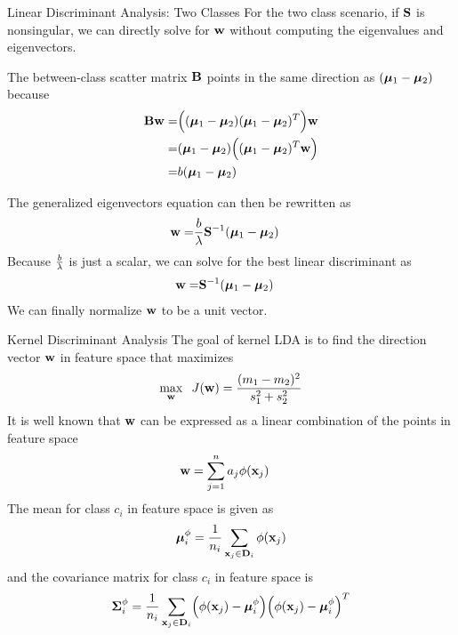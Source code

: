 \begin{frame}{Linear Discriminant Analysis: Two Classes}
For the two class scenario, if $\mathbf{S}$ is nonsingular, we can
directly solve for $\mathbf{w}$ without computing the eigenvalues and
eigenvectors. 

\medskip
The between-class scatter matrix $\mathbf{B}$
points in the same direction as $({\bm \mu}_1-{\bm \mu}_2)$ because
\begin{align*}
  \mathbf{B}\mathbf{w} = & \Bigl( ({\bm \mu}_1 - {\bm \mu}_2) ({\bm \mu}_1 - {\bm \mu}_2)^T\Bigr) \mathbf{w}\notag\\
  = & ({\bm \mu}_1 - {\bm \mu}_2) \Bigl(({\bm \mu}_1 - {\bm \mu}_2)^T \mathbf{w}\Bigr)\notag\\
  = & b ({\bm \mu}_1 - {\bm \mu}_2)
\end{align*}

\medskip
The generalized eigenvectors equation can then be 
rewritten as 
\begin{align*}
  \mathbf{w} = & \frac{b}{\lambda} \mathbf{S}^{-1} ({\bm \mu}_1 - {\bm \mu}_2)
\end{align*}
Because ${b \over \lambda}$ is just a scalar, we can solve for the
best linear discriminant as
\begin{align*}
  \mathbf{w} = & \mathbf{S}^{-1} ({\bm \mu}_1 - {\bm \mu}_2)
\end{align*}
We can finally normalize $\mathbf{w}$ to be a unit vector.
\end{frame}



\begin{frame}{Kernel Discriminant Analysis} 
The goal of kernel LDA is to f\/{i}nd the direction vector $\mathbf{w}$ in
feature space that maximizes
\begin{align*}
        \max_{\mathbf{w}} \;\; J(\mathbf{w}) = \frac{(m_1 - m_2)^2}{s_1^2 + s_2^2}
\end{align*}
It is well known that 
$\mathbf{w}$ can be expressed as a linear combination of the
points in feature space
\begin{align*}
  \mathbf{w} 
  & = \sum_{j=1}^n a_{j} \phi(\mathbf{x}_{j})
\end{align*}
The mean for class $c_i$ in feature space is given as
\begin{align*}
{\bm \mu}^\phi_i = {1 \over n_i} \sum_{\mathbf{x}_{j} \in \mathbf{D}_i} \phi(\mathbf{x}_{j})
\end{align*}
and the covariance matrix for class $c_i$ in feature space is
\begin{align*}
  {\bm \Sigma}_i^\phi = {1 \over n_i} \sum_{\mathbf{x}_{j} \in \mathbf{D}_i}
  \Bigl(\phi(\mathbf{x}_{j}) - {\bm \mu}_i^\phi\Bigr)
  \Bigl(\phi(\mathbf{x}_{j})- {\bm \mu}_i^\phi\Bigr)^T
\end{align*}
\end{frame}




